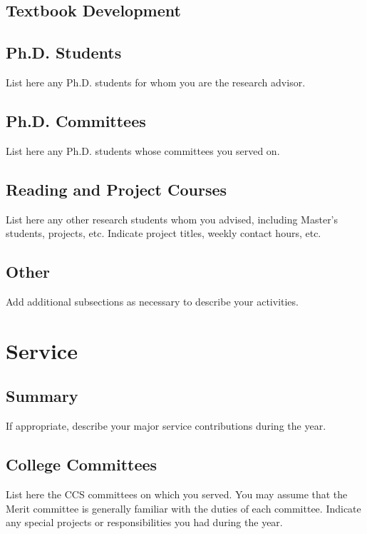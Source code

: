 \subsection{Textbook Development}

\subsection{Ph.D. Students}

List here any Ph.D. students for whom you are the research advisor.

\subsection{Ph.D. Committees}

List here any Ph.D. students whose committees you served on.

\subsection{Reading and Project Courses}

List here any other research students whom you advised, including Master's
students, projects, etc.  Indicate project titles, weekly contact
hours, etc. 

\subsection{Other}

Add additional subsections as necessary to describe your activities.

\section{Service}

\subsection{Summary}

If appropriate, describe your major service contributions during the year.

\subsection{College Committees}

List here the CCS committees on which you served.  You may assume that the
Merit committee is generally familiar with the duties of each committee.
Indicate any special projects or responsibilities you had during the year.

